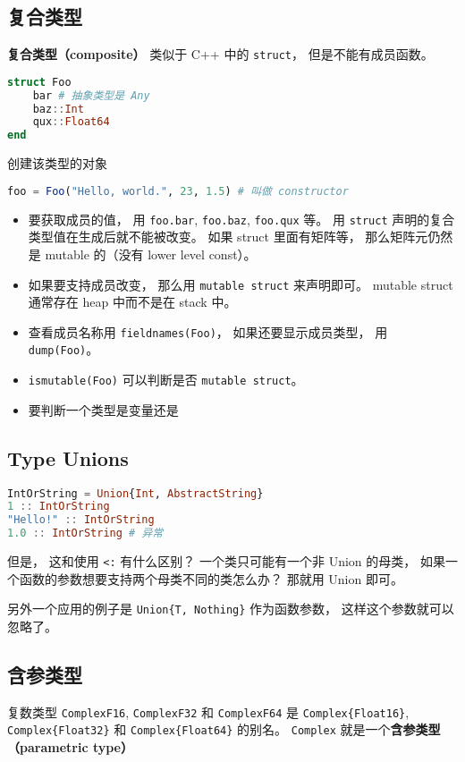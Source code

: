 \subsection{复合类型}
\textbf{复合类型（composite）} 类似于 C++ 中的 \verb|struct|， 但是不能有成员函数。
\begin{lstlisting}[language=julia]
struct Foo
    bar # 抽象类型是 Any
    baz::Int
    qux::Float64
end
\end{lstlisting}
创建该类型的对象
\begin{lstlisting}[language=julia]
foo = Foo("Hello, world.", 23, 1.5) # 叫做 constructor
\end{lstlisting}
\begin{itemize}
\item 要获取成员的值， 用 \verb|foo.bar|, \verb|foo.baz|, \verb|foo.qux| 等。 用 \verb|struct| 声明的复合类型值在生成后就不能被改变。 如果 struct 里面有矩阵等， 那么矩阵元仍然是 mutable 的（没有 lower level const）。
\item 如果要支持成员改变， 那么用 \verb|mutable struct| 来声明即可。 mutable struct 通常存在 heap 中而不是在 stack 中。
\item 查看成员名称用 \verb|fieldnames(Foo)|， 如果还要显示成员类型， 用 \verb|dump(Foo)|。
\item \verb|ismutable(Foo)| 可以判断是否 \verb|mutable struct|。
\item 要判断一个类型是变量还是
\end{itemize}

\subsection{Type Unions}
\begin{lstlisting}[language=julia]
IntOrString = Union{Int, AbstractString}
1 :: IntOrString
"Hello!" :: IntOrString
1.0 :: IntOrString # 异常
\end{lstlisting}
但是， 这和使用 \verb|<:| 有什么区别？ 一个类只可能有一个非 Union 的母类， 如果一个函数的参数想要支持两个母类不同的类怎么办？ 那就用 Union 即可。

另外一个应用的例子是 \verb|Union{T, Nothing}| 作为函数参数， 这样这个参数就可以忽略了。

\subsection{含参类型}

复数类型 \verb|ComplexF16|, \verb|ComplexF32| 和 \verb|ComplexF64| 是 \verb|Complex{Float16}|, \verb|Complex{Float32}| 和 \verb|Complex{Float64}| 的别名。 \verb|Complex| 就是一个\textbf{含参类型（parametric type）}

